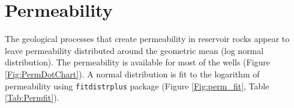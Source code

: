 \section{Permeability}
The geological processes that create permeability in reservoir rocks appear to leave permeability distributed around the geometric mean (log normal distribution). The permeability is available for most of the wells (Figure \ref{Fig:PermDotChart}). A normal distribution is fit to the logarithm of permeability using \texttt{fitdistrplus} package (Figure \ref{Fig:perm_fit}, Table \ref{Tab:Permfit}).


\begin{knitrout}
\color{fgcolor}\begin{kframe}


{\ttfamily\noindent\bfseries\color{errorcolor}{\#\# Error: object 'perm.data' not found}}

{\ttfamily\noindent\bfseries\color{errorcolor}{\#\# Error: object 'perm.data' not found}}

{\ttfamily\noindent\bfseries\color{errorcolor}{\#\# Error: object 'perm.data' not found}}

{\ttfamily\noindent\bfseries\color{errorcolor}{\#\# Error: object 'perm.data' not found}}\end{kframe}
\end{knitrout}


\begin{knitrout}
\color{fgcolor}\begin{kframe}


{\ttfamily\noindent\bfseries{}}

{\ttfamily\noindent\bfseries\color{errorcolor}{\#\# Error: object 'fit.perm' not found}}\end{kframe}
\end{knitrout}


\begin{kframe}


{\ttfamily\noindent\bfseries\color{errorcolor}{\#\# Error: object 'fit.perm' not found}}

{\ttfamily\noindent\bfseries{}}\end{kframe}

\pagebreak
